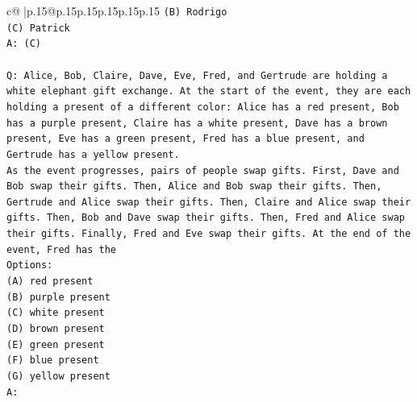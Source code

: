 \documentclass{article}
\begin{document}
{\begin{supertabular}{c@{$\;$}|p{.15\linewidth}@{}p{.15\linewidth}p{.15\linewidth}p{.15\linewidth}p{.15\linewidth}p{.15\linewidth}}
{{{\texttt{(B) Rodrigo} \\
\texttt{(C) Patrick} \\
\texttt{A: (C)} \\
\\ 
\texttt{Q: Alice, Bob, Claire, Dave, Eve, Fred, and Gertrude are holding a white elephant gift exchange. At the start of the event, they are each holding a present of a different color: Alice has a red present, Bob has a purple present, Claire has a white present, Dave has a brown present, Eve has a green present, Fred has a blue present, and Gertrude has a yellow present.} \\
\texttt{As the event progresses, pairs of people swap gifts. First, Dave and Bob swap their gifts. Then, Alice and Bob swap their gifts. Then, Gertrude and Alice swap their gifts. Then, Claire and Alice swap their gifts. Then, Bob and Dave swap their gifts. Then, Fred and Alice swap their gifts. Finally, Fred and Eve swap their gifts. At the end of the event, Fred has the} \\
\texttt{Options:} \\
\texttt{(A) red present} \\
\texttt{(B) purple present} \\
\texttt{(C) white present} \\
\texttt{(D) brown present} \\
\texttt{(E) green present} \\
\texttt{(F) blue present} \\
\texttt{(G) yellow present} \\
\texttt{A:} \\
            }
        }
    }
     \\ \\


\end{supertabular}}
\end{document}
